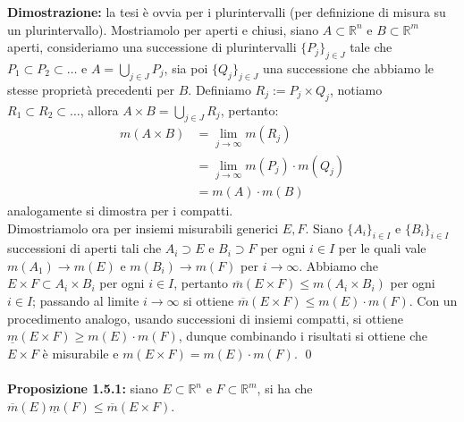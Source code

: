 \documentclass{article}
\numberwithin{equation}{subsection}
\begin{document}
\textbf{Dimostrazione:} la tesi è ovvia per i plurintervalli (per definizione di misura su un plurintervallo). Mostriamolo per aperti e chiusi, siano $A \subset \mathbb{R}^n$ e $B \subset \mathbb{R}^m$ aperti, consideriamo una successione di plurintervalli $\{ P_j \}_{j \in J}$ tale che $P_1 \subset P_2 \subset \dots$ e $A = \bigcup_{j \in J} P_j$, sia poi $\{ Q_j \}_{j \in J}$ una successione che abbiamo le stesse proprietà precedenti per $B$. Definiamo $R_j := P_j \times Q_j$, notiamo $R_1 \subset R_2 \subset \dots$, allora $A \times B = \bigcup_{j \in J} R_j$, pertanto:
\begin{align*}
    m(A \times B) &= \lim_{j \rightarrow \infty} m(R_j)  \\
    &= \lim_{j \rightarrow \infty} m(P_j) \cdot m(Q_j)  \\
    &= m(A) \cdot m(B) 
\end{align*}
analogamente si dimostra per i compatti.\\
Dimostriamolo ora per insiemi misurabili generici $E, F$. Siano $\{ A_i \}_{i \in I}$ e $\{ B_i \}_{i \in I}$ successioni di aperti tali che $A_i \supset E$ e $B_i \supset F$ per ogni $i \in I$ per le quali vale $m(A_1) \rightarrow m(E)$ e $m(B_i) \rightarrow m(F)$ per $i \rightarrow \infty$. Abbiamo che $E \times F \subset A_i \times B_i$ per ogni $i \in I$, pertanto $\overline{m}(E \times F) \leq m(A_i \times B_i)$ per ogni $i \in I$; passando al limite $i \rightarrow \infty$ si ottiene $\overline{m}(E \times F) \leq m(E) \cdot m(F)$. Con un procedimento analogo, usando successioni di insiemi compatti, si ottiene $\underline{m}(E \times F) \geq m(E) \cdot m(F)$, dunque combinando i risultati si ottiene che $E \times F$ è misurabile e $m(E \times F) = m(E) \cdot m(F)$. \qed \\ \\
\textbf{Proposizione 1.5.1:} siano $E \subset \mathbb{R}^n$ e $F \subset \mathbb{R}^m$, si ha che $\overline{m}(E)\underline{m}(F) \leq \overline{m}(E \times F)$. \\
\end{document}
